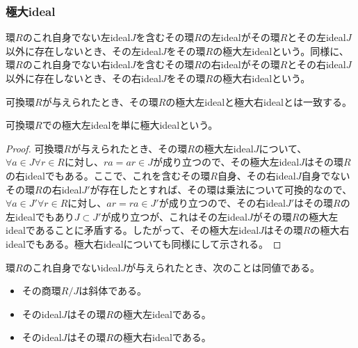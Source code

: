 \documentclass[dvipdfmx]{jsarticle}
\begin{document}
\subsubsection{極大ideal}%
\begin{dfn}
環$R$のこれ自身でない左ideal$J$を含むその環$R$の左idealがその環$R$とその左ideal$J$以外に存在しないとき、その左ideal$J$をその環$R$の極大左idealという。同様に、環$R$のこれ自身でない右ideal$J$を含むその環$R$の右idealがその環$R$とその右ideal$J$以外に存在しないとき、その右ideal$J$をその環$R$の極大右idealという。
\end{dfn}
\begin{thm}\label{3.3.2.24}
可換環$R$が与えられたとき、その環$R$の極大左idealと極大右idealとは一致する。
\end{thm}
\begin{dfn}
可換環$R$での極大左idealを単に極大idealという。
\end{dfn}
\begin{proof}
可換環$R$が与えられたとき、その環$R$の極大左ideal$J$について、$\forall a \in J\forall r \in R$に対し、$ra = ar \in J$が成り立つので、その極大左ideal$J$はその環$R$の右idealでもある。ここで、これを含むその環$R$自身、その右ideal$J$自身でないその環$R$の右ideal$J'$が存在したとすれば、その環は乗法について可換的なので、$\forall a \in J'\forall r \in R$に対し、$ar = ra \in J'$が成り立つので、その右ideal$J'$はその環$R$の左idealでもあり$J \subset J'$が成り立つが、これはその左ideal$J$がその環$R$の極大左idealであることに矛盾する。したがって、その極大左ideal$J$はその環$R$の極大右idealでもある。極大右idealについても同様にして示される。
\end{proof}
\begin{thm}\label{3.3.2.25}
環$R$のこれ自身でないideal$J$が与えられたとき、次のことは同値である。
\begin{itemize}
\item
  その商環${R}/{J}$は斜体である。
\item
  そのideal$J$はその環$R$の極大左idealである。
\item
  そのideal$J$はその環$R$の極大右idealである。
\end{itemize}
\end{thm}
\end{document}
